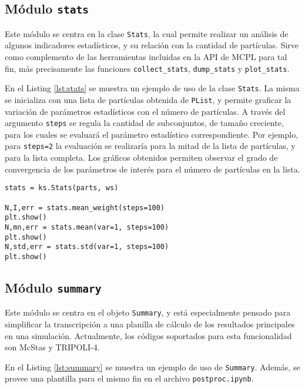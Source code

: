 \subsection{Módulo \texttt{stats}}

Este módulo se centra en la clase \verb|Stats|, la cual permite realizar un análisis de algunos indicadores estadísticos, y su relación con la cantidad de partículas. Sirve como complemento de las herramientas incluidas en la API de MCPL para tal fin, más precisamente las funciones \verb|collect_stats|, \verb|dump_stats| y \verb|plot_stats|.

En el Listing \ref{lst:stats} se muestra un ejemplo de uso de la clase \verb|Stats|. La misma se inicializa con una lista de partículas obtenida de \verb|PList|, y permite graficar la variación de parámetros estadísticos con el número de partículas. A través del argumento \verb|steps| se regula la cantidad de subconjuntos, de tamaño creciente, para los cuales se evaluará el parámetro estadístico correspondiente. Por ejemplo, para \verb|steps=2| la evaluación se realizaría para la mitad de la lista de partículas, y para la lista completa. Los gráficos obtenidos permiten observar el grado de convergencia de los parámetros de interés para el número de partículas en la lista.

\begin{lstlisting}[language=Python2, label={lst:stats}, caption=Ejemplo de uso de \texttt{Stats}.]
stats = ks.Stats(parts, ws)

N,I,err = stats.mean_weight(steps=100)
plt.show()
N,mn,err = stats.mean(var=1, steps=100)
plt.show()
N,std,err = stats.std(var=1, steps=100)
plt.show()
\end{lstlisting}


\subsection{Módulo \texttt{summary}}

Este módulo se centra en el objeto \verb|Summary|, y está especialmente pensado para simplificar la transcripción a una planilla de cálculo de los resultados principales en una simulación. Actualmente, los códigos soportados para esta funcionalidad son McStas y TRIPOLI-4.

En el Listing \ref{lst:summary} se muestra un ejemplo de uso de \verb|Summary|. Además, se provee una plantilla para el mismo fin en el archivo \verb|postproc.ipynb|.

